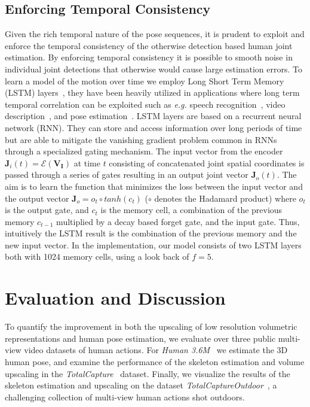 \documentclass[runningheads]{llncs}
\begin{document}
\subsection {Enforcing Temporal Consistency}
\label{sec:LSTM}
Given the rich temporal nature of the pose sequences, it is prudent to exploit and enforce the temporal consistency of the otherwise detection based human joint estimation. By enforcing temporal consistency it is possible to smooth noise in individual joint detections that otherwise would cause large estimation errors. To learn a model of the motion over time we employ Long Short Term Memory (LSTM) layers~\cite{hochreiter1997LSTM}, they have been heavily utilized in applications where long term temporal correlation can be exploited such as \emph{e.g.} speech recognition~\cite{sak2014lstmSpeech}, video description~\cite{donahue2015lstmVideo}, and pose estimation~\cite{luo2017lstm}. LSTM layers are based on a  recurrent neural network (RNN). They can store and access information over long periods of time but are able to mitigate the vanishing gradient problem common in RNNs through a specialized gating mechanism. The input vector from the encoder $\mathbf{J}_i(t)=\mathcal{E}(\mathbf{V_I})$ at time $t$ consisting of concatenated joint spatial coordinates is passed through a series of gates resulting in an output joint vector $\mathbf{J}_o(t)$. The aim is to learn the function that minimizes the loss between the input vector and the output vector $\mathbf{J}_o = o_t \circ tanh(c_t)$ ($\circ$  denotes the Hadamard product) where $o_t$ is the output gate, and $c_t$ is the memory cell, a combination of the previous memory $c_{t-1}$ multiplied by a decay based forget gate, and the input gate. Thus, intuitively the LSTM result is the combination of the previous memory and the new input vector. In the implementation, our model consists of two LSTM layers both with 1024 memory cells, using a look back of $f=5$. 

\section{Evaluation and Discussion}
\label{sec:Eval}
To quantify the improvement in both the upscaling of low resolution volumetric representations and human pose estimation, we evaluate over three public multi-view video datasets of human actions. For \emph{Human 3.6M}~\cite{h36m_pami} we estimate the 3D human pose, and examine the performance of the skeleton estimation and volume upscaling in the \emph{TotalCapture}~\cite{trumble_total_2017} dataset. Finally, we visualize the results of the skeleton estimation and upscaling on the dataset \emph{TotalCaptureOutdoor}~\cite{Malleson:3DV:2017}, a challenging collection of multi-view human actions shot outdoors.
\end{document}
